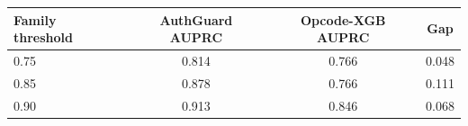\begin{tabular}{lccc}
\toprule
Family threshold & AuthGuard AUPRC & Opcode-XGB AUPRC & Gap \\
\midrule
0.75 & 0.814 & 0.766 & 0.048 \\
0.85 & 0.878 & 0.766 & 0.111 \\
0.90 & 0.913 & 0.846 & 0.068 \\
\bottomrule
\end{tabular}
